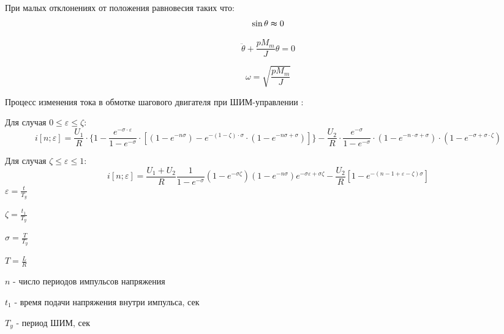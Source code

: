При малых отклонениях от положения равновесия таких что:
\begin{equation}
    \sin{\theta} \thickapprox 0
\end{equation}

\begin{equation}
    \label{rotor_like_harmonical_oscilator_equation}
    \ddot{\theta} + \frac{p M_{m}}{J} \theta = 0
\end{equation}

\begin{equation}
    \label{friquent_for_rotor_self_oscilating}
    \omega = \sqrt{\frac{p M_{m}}{J}}
\end{equation}

Процесс изменения тока в обмотке шагового двигателя при ШИМ-управлении \cite[гл. 6.4, стр. 239]{Chilikin}:

Для случая $0 \le \varepsilon \le \zeta$:
\begin{equation}
    \label{winding_current_with_pwm_control_1}
    i[n ; \varepsilon] =
        \frac{U_{1}}{R}
            \cdot \{ 1
                 -\frac { e^{ -\sigma \cdot \varepsilon } }
                        { 1 - e^{-\sigma} }
                    \cdot [ (1 - e^{-n\sigma})
                              - e^{ -(1 - \zeta) \cdot \sigma }
                                    \cdot ( 1 - e^{-n\sigma + \sigma} )
                          ]
              \}
        -\frac{ U_2 }{ R }
            \cdot \frac {e^{-\sigma}} {1 - e^{-\sigma}}
            \cdot ( 1 - e^{ -n \cdot \sigma + \sigma } )
            \cdot ( 1 - e^{ -\sigma + \sigma \cdot \zeta } )
\end{equation}

Для случая $\zeta \le \varepsilon \le 1$:
\begin{equation}
    \label{winding_current_with_pwm_control_0}
    i[n; \varepsilon] = \frac{U_{1} + U_{2}}{R}\frac{1}{1 - e^{-\sigma}}(1 - e^{-\sigma\zeta})(1 - e^{-n\sigma})e^{-\sigma\varepsilon + \sigma\zeta} - \frac{U_{2}}{R}[1 - e^{-(n - 1 + \varepsilon - \zeta)\sigma}]
\end{equation}
$\varepsilon = \frac{t}{T_{y}}$

$\zeta = \frac{t_{1}}{T_{y}}$

$\sigma = \frac{T}{T_{y}}$

$T = \frac{L}{R}$

$n$ - число периодов импульсов напряжения

$t_{1}$ - время подачи напряжения внутри импульса, сек

$T_{y}$ - период ШИМ, сек

